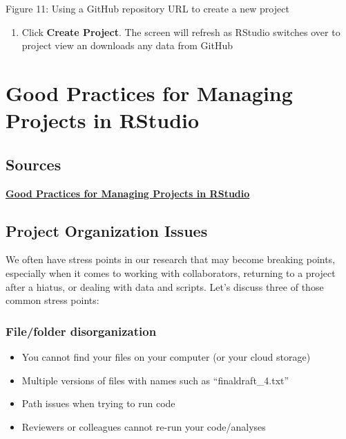 \documentclass[
]{article}
\providecommand{\tightlist}{%
  \setlength{\itemsep}{0pt}\setlength{\parskip}{0pt}}
\begin{document}
Figure 11: Using a GitHub repository URL to create a new project

\begin{enumerate}
\def\labelenumi{\arabic{enumi}.}
\setcounter{enumi}{6}
\tightlist
\item
  Click \textbf{Create Project}. The screen will refresh as RStudio
  switches over to project view an downloads any data from GitHub
\end{enumerate}

\hypertarget{good-practices-for-managing-projects-in-rstudio}{%
\section{Good Practices for Managing Projects in
RStudio}\label{good-practices-for-managing-projects-in-rstudio}}

\hypertarget{sources}{%
\subsection{Sources}\label{sources}}

\href{Good\%20Practices\%20for\%20Managing\%20Projects\%20in\%20RStudio}{\textbf{Good
Practices for Managing Projects in RStudio}}

\hypertarget{project-organization-issues}{%
\subsection{Project Organization
Issues}\label{project-organization-issues}}

We often have stress points in our research that may become breaking
points, especially when it comes to working with collaborators,
returning to a project after a hiatus, or dealing with data and scripts.
Let's discuss three of those common stress points:

\hypertarget{filefolder-disorganization}{%
\subsubsection{File/folder
disorganization}\label{filefolder-disorganization}}

\begin{itemize}
\tightlist
\item
  You cannot find your files on your computer (or your cloud storage)
\item
  Multiple versions of files with names such as ``finaldraft\_4.txt''
\item
  Path issues when trying to run code
\item
  Reviewers or colleagues cannot re-run your code/analyses
\end{itemize}
\end{document}
